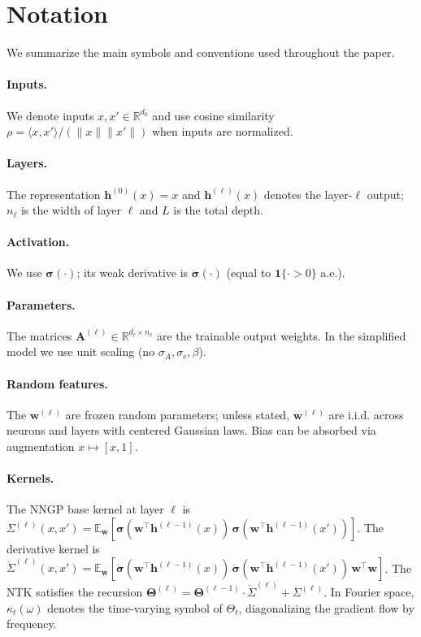 \documentclass{article}
\DeclareRobustCommand{\ReLU}{\mathrel{\boldsymbol{\sigma}}}
\newcommand{\Kop}{\boldsymbol{\Theta}}
\begin{document}
\vspace{2em}
\section{Notation}
We summarize the main symbols and conventions used throughout the paper.
\paragraph{Inputs.} We denote inputs \( x,x' \in \mathbb{R}^{d_0} \) and use cosine similarity \( \rho=\langle x,x'\rangle/(\|x\|\|x'\|) \) when inputs are normalized.

\paragraph{Layers.} The representation \( \bm{h}^{(0)}(x)=x \) and \( \bm{h}^{(\ell)}(x) \) denotes the layer-\( \ell \) output; \( n_\ell \) is the width of layer \( \ell \) and \( L \) is the total depth.

\paragraph{Activation.} We use \( \ReLU(\cdot) \); its weak derivative is \( \dot{\ReLU}(\cdot) \) (equal to \( \mathbf{1}\{\cdot>0\} \) a.e.).

\paragraph{Parameters.} The matrices \( \bm{A}^{(\ell)} \in \mathbb{R}^{d_{\ell} \times n_\ell} \) are the trainable output weights. In the simplified model we use unit scaling (no \( \sigma_A, \sigma_c, \beta \)).

\paragraph{Random features.} The \( \bm{w}^{(\ell)} \) are frozen random parameters; unless stated, \( \bm{w}^{(\ell)} \) are i.i.d. across neurons and layers with centered Gaussian laws. Bias can be absorbed via augmentation \( x \mapsto [x, 1] \).

\paragraph{Kernels.} The NNGP base kernel at layer \( \ell \) is \( \displaystyle \Sigma^{(\ell)}(x,x')=\mathbb{E}_{\bm{w}}[\ReLU(\bm{w}^\top \bm{h}^{(\ell-1)}(x))\,\ReLU(\bm{w}^\top \bm{h}^{(\ell-1)}(x'))] \). The derivative kernel is \( \displaystyle \dot{\Sigma}^{(\ell)}(x,x')=\mathbb{E}_{\bm{w}}[\dot{\ReLU}(\bm{w}^\top \bm{h}^{(\ell-1)}(x))\,\dot{\ReLU}(\bm{w}^\top \bm{h}^{(\ell-1)}(x'))\,\bm{w}^\top\bm{w}] \). The NTK satisfies the recursion \( \Kop^{(\ell)} = \Kop^{(\ell-1)}\cdot\dot{\Sigma}^{(\ell)} + \Sigma^{(\ell)} \). In Fourier space, \( \kappa_t(\omega) \) denotes the time-varying symbol of \( \Theta_t \), diagonalizing the gradient flow by frequency.
\end{document}
